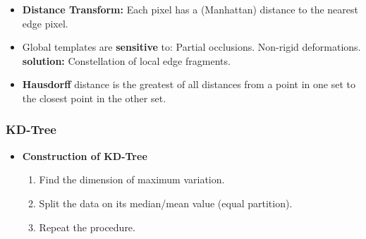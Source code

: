 \documentclass{../cheat}
\begin{document}
\begin{multicols}{3}
\begin{itemize}[nolistsep, leftmargin=1em]
		\item \textbf{Distance Transform:} Each pixel has a (Manhattan) distance to the nearest edge pixel.
		
		\item Global templates are \textbf{sensitive} to:
			 Partial occlusions.
			 Non-rigid deformations. 
			 \textbf{solution:} Constellation of local edge fragments.	
		
		\item \textbf{Hausdorff} distance is the greatest of all distances from a point in one set to the closest point in the other set.
	\end{itemize}
	
	\subsubsection{KD-Tree}
	\begin{itemize}[nolistsep, leftmargin=1em]
		\item \textbf{Construction of KD-Tree}
			\begin{enumerate}
				\item Find the dimension of maximum variation.
				\item Split the data on its median/mean value (equal partition).
				\item Repeat the procedure.
			\end{enumerate}


\end{itemize}
\end{multicols}
\end{document}
